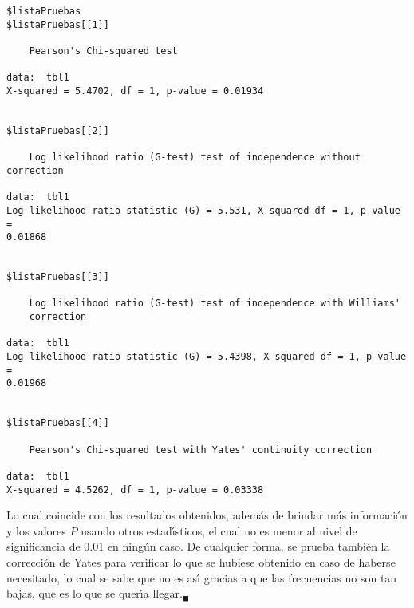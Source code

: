 \begin{solucion}
\begin{verbatim}
$listaPruebas
$listaPruebas[[1]]

	Pearson's Chi-squared test

data:  tbl1
X-squared = 5.4702, df = 1, p-value = 0.01934


$listaPruebas[[2]]

	Log likelihood ratio (G-test) test of independence without correction

data:  tbl1
Log likelihood ratio statistic (G) = 5.531, X-squared df = 1, p-value =
0.01868


$listaPruebas[[3]]

	Log likelihood ratio (G-test) test of independence with Williams'
	correction

data:  tbl1
Log likelihood ratio statistic (G) = 5.4398, X-squared df = 1, p-value =
0.01968


$listaPruebas[[4]]

	Pearson's Chi-squared test with Yates' continuity correction

data:  tbl1
X-squared = 4.5262, df = 1, p-value = 0.03338
 \end{verbatim}
 \vspace{-0.5cm}
 Lo cual coincide con los resultados obtenidos, adem\'as de brindar m\'as
 informaci\'on y los valores $P$ usando otros estad\'{\i}sticos, 
 el cual no es menor al nivel de significancia de $0.01$ en ning\'un caso.
 De cualquier forma, se prueba tambi\'en la correcci\'on de Yates
 para verificar lo que se hubiese obtenido en caso de haberse necesitado,
 lo cual se sabe que no es as\'{\i} gracias a que las frecuencias no son
 tan bajas, que es lo que se quer\'{\i}a llegar.${}_{\blacksquare}$
\end{solucion}
